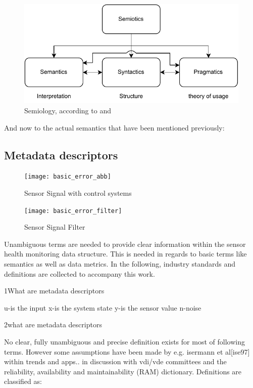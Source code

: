 \begin{figure}
    \centering
    \includegraphics[width=.7\textwidth]{03_figures/semiotics.pdf}
    \caption{Semiology, according to \textcite{kutschera_sprachphilosophie_1975} and \textcite{shoemaker_spreading_1987}}
\end{figure}


And now to the actual semantics that have been mentioned previously:

\subsection{Metadata descriptors}


\begin{figure}[ht]
    \centering
    \texttt{[image: basic\_error\_abb]}
    \caption{Sensor Signal with control systems}
    \label{fig:basic_error_abb}
\end{figure}
\begin{figure}[ht]
    \centering
    \texttt{[image: basic\_error\_filter]}
    \caption{Sensor Signal Filter}
    \label{fig:basic_error_filter}
\end{figure}


Unambiguous terms are needed to provide clear information within the sensor health monitoring data structure. This is needed in regards to basic terms like semantics as well as data metrics. In the following, industry standards and definitions are collected to accompany this work.






1What are metadata descriptors

u-is the input
x-is the system state
y-is the sensor value
n-noise


2what are metadata descriptors


No clear, fully unambiguous and precise definition exists for most of following terms. However some assumptions have been made by e.g. isermann et al[ise97] within trends and apps.. in discussion with vdi/vde committees and the reliability, availability and maintainability (RAM) dictionary. Definitions are classified as:

